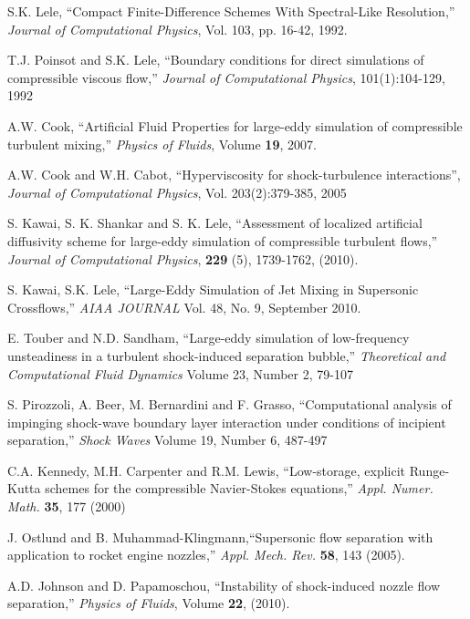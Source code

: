 \documentclass[]{aiaa-tc}%
\begin{document}
\begin{thebibliography}{10}%
 
 	S.K. Lele, ``Compact Finite-Difference Schemes With Spectral-Like Resolution,'' \emph{Journal of Computational
	Physics}, Vol. 103, pp. 16-42, 1992.
	
	T.J. Poinsot and S.K. Lele, ``Boundary conditions for direct simulations of compressible viscous flow,'' \emph{Journal of Computational Physics}, 101(1):104-129, 1992

 	A.W. Cook,  ``Artificial Fluid Properties for large-eddy simulation of compressible turbulent mixing,'' \emph{Physics of Fluids}, Volume {\bf 19}, 2007.
	
	A.W. Cook and W.H. Cabot, ``Hyperviscosity for shock-turbulence interactions'', \emph{Journal of Computational Physics}, Vol. 203(2):379-385, 2005
 
 	S. Kawai, S. K. Shankar and S. K. Lele, ``Assessment of localized artificial diffusivity scheme for large-eddy simulation of compressible turbulent flows,'' \emph{Journal of Computational Physics}, {\bf 		229} (5), 1739-1762, (2010).
	
	S. Kawai, S.K. Lele, ``Large-Eddy Simulation of Jet Mixing in Supersonic Crossflows,'' \emph{AIAA JOURNAL} Vol. 48, No. 9, September 2010.
	
 	E. Touber and N.D. Sandham, ``Large-eddy simulation of low-frequency unsteadiness in a turbulent shock-induced separation bubble,'' \emph{Theoretical and Computational Fluid Dynamics} Volume 23, Number 2, 79-107

 	S. Pirozzoli, A. Beer, M. Bernardini and F. Grasso, ``Computational analysis of impinging shock-wave boundary layer interaction under conditions of incipient separation,'' \emph{Shock Waves} Volume 19, Number 6, 487-497

 	C.A. Kennedy, M.H. Carpenter and R.M. Lewis, ``Low-storage, explicit Runge-Kutta schemes for the compressible Navier-Stokes equations,'' \emph{Appl. Numer. Math.} {\bf 35}, 177 (2000) 
 
 	J. Ostlund and B. Muhammad-Klingmann,``Supersonic flow separation with application to rocket engine nozzles,'' \emph{Appl. Mech. Rev.} {\bf 58}, 143 (2005).
 
 	A.D. Johnson and D. Papamoschou, ``Instability of shock-induced nozzle flow separation,'' \emph{Physics of Fluids}, Volume {\bf 22}, (2010).
	

\end{thebibliography}
\end{document}

